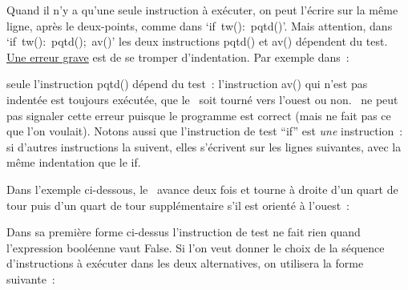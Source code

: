 Quand il n'y a qu'une seule instruction à exécuter, on peut l'écrire sur la même ligne, après le
deux-points, comme dans `{\mcl if}\ {\idt tw():\ pqtd()}'. Mais attention, dans
`{\mcl if}\ {\idt tw():\ pqtd();\ av()}' les deux instructions {\idt pqtd()} et {\idt av()} dépendent du test.
\underline{Une erreur grave} est de se tromper d'indentation. Par exemple dans~:
{
\parindent {}
\medskip

\vspace{\neglskip}\mbox{}\par
\vspace{\neglskip}\mbox{\blc \blk{}}\par
\vspace{\neglskip}\mbox{}\par

\medskip }
\noindent seule l'instruction {\idt pqtd()} dépend du test~: l'instruction {\idt av()}
qui n'est pas indentée est toujours exé\-cu\-tée, que le \robot\ soit tourné vers l'ouest ou non.
\python\ ne peut pas signaler cette erreur puisque le programme est correct (mais ne fait pas
ce que l'on voulait). Notons aussi que l'instruction de test ``if'' est {\em une} instruction~:
si d'autres instructions la suivent, elles s'écrivent sur les lignes suivantes, avec la même
indentation que le {\mcl if}.


Dans l'exemple ci-dessous, le \robot\ avance deux fois et tourne à droite d'un quart de tour puis
d'un quart de tour supplémentaire 
s'il est orienté à l'ouest~:

\vspace{\baselineskip}

 {\raggedright 
 
}
 
 Dans sa première forme ci-dessus l'instruction de test ne fait rien quand l'expression booléenne
 vaut {\mcl False}. Si l'on veut donner le choix de la séquence d'instructions à exécuter dans les
 deux alternatives, on utilisera la forme suivante~:
 
